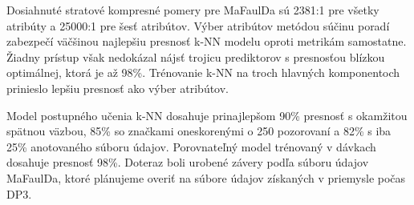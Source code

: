 Dosiahnuté stratové kompresné pomery pre MaFaulDa sú 2381:1 pre všetky atribúty a 25000:1 pre šesť atribútov. Výber atribútov metódou súčinu poradí zabezpečí väčšinou najlepšiu presnosť k-NN modelu oproti metrikám samostatne. Žiadny prístup však nedokázal nájsť trojicu prediktorov s presnosťou blízkou optimálnej, ktorá je až 98\%. Trénovanie k-NN na troch hlavných komponentoch prinieslo lepšiu presnosť ako výber atribútov. 

Model postupného učenia k-NN dosahuje prinajlepšom 90\% presnosť s okamžitou spätnou väzbou, 85\% so značkami oneskorenými o 250 pozorovaní a 82\% s iba 25\% anotovaného súboru údajov. Porovnateľný model trénovaný v dávkach dosahuje presnosť 98\%.  Doteraz boli urobené závery podľa súboru údajov MaFaulDa, ktoré plánujeme overiť na súbore údajov získaných v priemysle počas DP3.

\clearpage